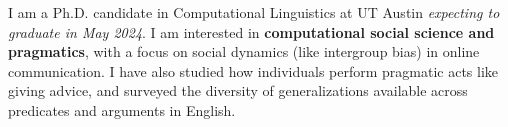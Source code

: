 I am a Ph.D. candidate in Computational Linguistics at UT Austin \emph{expecting to graduate in May 2024}. I am interested in \textbf{computational social science and pragmatics}, with a focus on social dynamics (like intergroup bias) in online communication. I have also studied how individuals perform pragmatic acts like giving advice, and surveyed the diversity of generalizations available across predicates and arguments in English.
